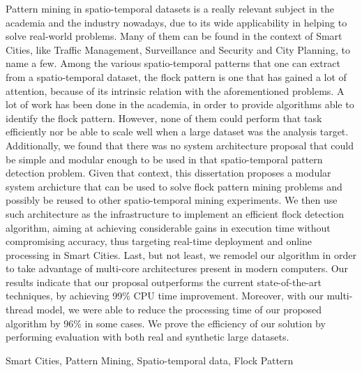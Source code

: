 Pattern mining in spatio-temporal datasets is a really relevant subject in the academia and the industry nowadays, due
to its wide applicability in helping to solve real-world problems. Many of them can be found in the context of Smart
Cities, like Traffic Management, Surveillance and Security and City Planning, to name a few. Among the various
spatio-temporal patterns that one can extract from a spatio-temporal dataset, the flock pattern is one that has gained a
lot of attention, because of its intrinsic relation with the aforementioned problems. A lot of work has been done in the
academia, in order to provide algorithms able to identify the flock pattern. However, none of them could perform that
task efficiently nor be able to scale well when a large dataset was the analysis target. Additionally, we found that
there was no system architecture proposal that could be simple and modular enough to be used in that spatio-temporal
pattern detection problem. Given that context, this dissertation proposes a modular system archicture that can be used
to solve flock pattern mining problems and possibly be reused to other spatio-temporal mining experiments. We then use
such architecture as the infrastructure to implement an efficient flock detection algorithm, aiming at achieving
considerable gains in execution time without compromising accuracy, thus targeting real-time deployment and online
processing in Smart Cities. Last, but not least, we remodel our algorithm in order to take advantage of multi-core
architectures present in modern computers. Our results indicate that our proposal outperforms the current
state-of-the-art techniques, by achieving 99\% CPU time improvement. Moreover, with our multi-thread model, we were able
to reduce the processing time of our proposed algorithm by 96\% in some cases. We prove the efficiency of our solution
by performing evaluation with both real and synthetic large datasets.

\begin{keywords}
Smart Cities, Pattern Mining, Spatio-temporal data, Flock Pattern
\end{keywords}
